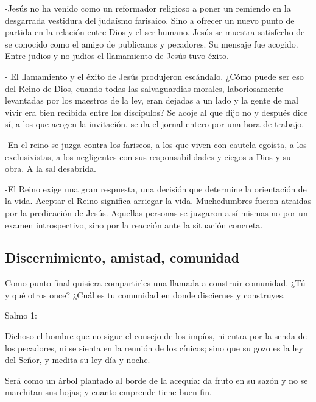 \documentclass[10pt]{article}
\begin{document}
    -Jesús no ha venido como un reformador religioso a poner un remiendo en la
    desgarrada vestidura del judaísmo farisaico. Sino a ofrecer un nuevo punto de
    partida en la relación entre Dios y el ser humano. Jesús se muestra satisfecho
    de se conocido como el amigo de publicanos y pecadores. Su mensaje fue
    acogido. Entre judios y no judios el llamamiento de Jesús tuvo éxito.

    - El llamamiento y el éxito de Jesús produjeron escándalo. ¿Cómo puede ser eso
    del Reino de Dios, cuando todas las salvaguardias morales, laboriosamente
    levantadas por los maestros de la ley, eran dejadas a un lado y la gente de
    mal vivir era bien recibida entre los discípulos? Se acoje al que dijo no y
    después dice sí, a los que acogen la invitación, se da el jornal entero por
    una hora de trabajo.

    -En el reino se juzga contra los fariseos, a los que viven con cautela
    egoísta, a los exclusivistas, a los negligentes con sus responsabilidades y
    ciegos a Dios y su obra. A la sal desabrida.

    -El Reino exige una gran respuesta, una decisión que determine la orientación
    de la vida. Aceptar el Reino significa arriegar la vida. Muchedumbres fueron
    atraidas por la predicación de Jesús. Aquellas personas se juzgaron a sí
    mismas no por un examen introspectivo, sino por la reacción ante la situación
    concreta.

\subsection{Discernimiento, amistad, comunidad}
  Como punto final quisiera compartirles una llamada a construir comunidad. ¿Tú y
  qué otros once? ¿Cuál es tu comunidad en donde disciernes y construyes.

Salmo 1:

Dichoso el hombre
que no sigue el consejo de los impíos,
ni entra por la senda de los pecadores,
ni se sienta en la reunión de los cínicos;
 sino que su gozo es la ley del Señor,
y medita su ley día y noche.


Será como un árbol 
plantado al borde de la acequia:
da fruto en su sazón
y no se marchitan sus hojas;
y cuanto emprende tiene buen fin.
\end{document}
